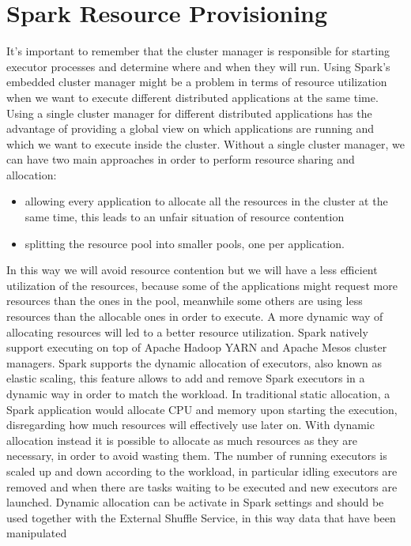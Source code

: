 \section{Spark Resource Provisioning}\label{sec:spark_resource_provisioning}
It's important to remember that the cluster manager is responsible for starting executor processes and determine where and when they will run. Using Spark’s embedded cluster manager might be a problem in terms of resource utilization when we want to execute different distributed applications at the same time. Using a single cluster manager for different distributed applications has the advantage of providing a global view on which applications are running and which we want to execute inside the cluster.
Without a single cluster manager, we can have two main approaches
in order to perform resource sharing and allocation:
\begin{itemize}
	\item  allowing every application to allocate all the resources in the cluster at the same time, this leads to an unfair situation of resource contention
	\item splitting the resource pool into smaller pools, one per application.
\end{itemize}
In this way we will avoid resource contention but we will
have a less efficient utilization of the resources, because some of
the applications might request more resources than the ones in
the pool, meanwhile some others are using less resources than
the allocable ones in order to execute.
A more dynamic way of allocating resources will led to a better resource
utilization. Spark natively support executing on top of Apache
Hadoop YARN and Apache Mesos cluster managers.
Spark supports the dynamic allocation of executors, also known as
elastic scaling, this feature allows to add and remove Spark executors
in a dynamic way in order to match the workload.
In traditional static allocation, a Spark application would allocate
CPU and memory upon starting the execution, disregarding how
much resources will effectively use later on. With dynamic allocation
instead it is possible to allocate as much resources as they are
necessary, in order to avoid wasting them. The number of running
executors is scaled up and down according to the workload, in particular
idling executors are removed and when there are tasks waiting
to be executed and new executors are launched. Dynamic allocation can 
be activate in Spark settings and should be used together with the
External Shuffle Service, in this way data that have been manipulated
